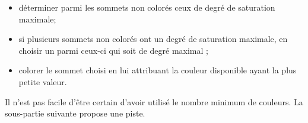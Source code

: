 \begin{itemize}
\item déterminer parmi les sommets non colorés ceux de degré de saturation maximale;
\item si plusieurs sommets non colorés ont un degré de saturation maximale, en choisir un parmi ceux-ci qui soit de degré maximal ;
\item colorer le sommet choisi en lui attribuant la couleur disponible ayant la plus petite valeur.
\end{itemize}
\ifprof
\begin{corrige}

\end{corrige}
\else
\fi

Il n'est pas facile d'être certain d'avoir utilisé le nombre minimum de couleurs. La sous-partie suivante propose une piste.

\question{}
\ifprof
\begin{corrige}

\end{corrige}
\else
\fi


\question{}
\ifprof
\begin{corrige}

\end{corrige}
\else
\fi


\question{}
\ifprof
\begin{corrige}

\end{corrige}
\else
\fi

